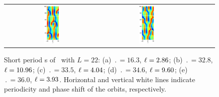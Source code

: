 \begin{figure}[t]
\begin{center}
\begin{tabular}{ccccc}
\includegraphics[width=0.18\textwidth]{figs/ks22rpo034.6-09.60.eps}\hspace{-3ex} &
\includegraphics[width=0.18\textwidth]{figs/ks22rpo036.0-03.93.eps}
\end{tabular}
\end{center}
\caption{Short period \rpo s of \KSe\ with $L = 22$:
(a) $\period{} = 16.3$, $\ell = 2.86$;
(b) $\period{} = 32.8$, $\ell = 10.96$;
(c) $\period{} = 33.5$, $\ell = 4.04$;
(d) $\period{} = 34.6$, $\ell = 9.60$;
(e) $\period{} = 36.0$, $\ell = 3.93$.
Horizontal and vertical white lines indicate periodicity and phase
shift of the orbits, respectively.
}\label{f:ks22rposShort}
\end{figure}



